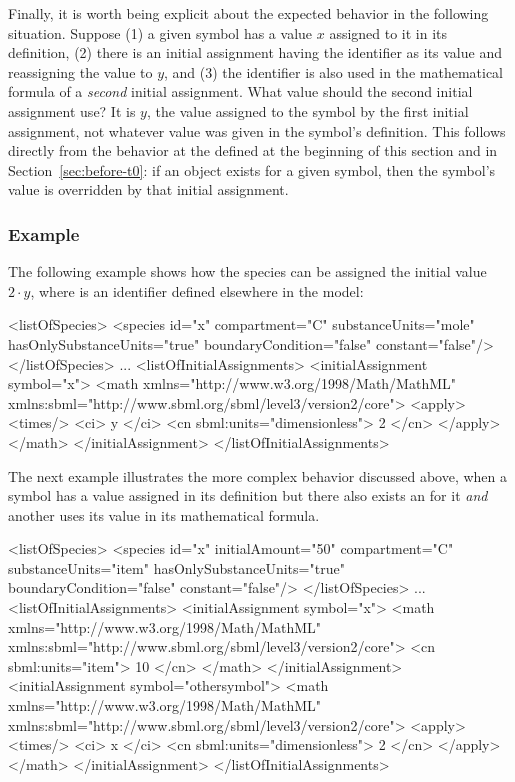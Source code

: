 Finally, it is worth being explicit about the expected behavior in
the following situation.  Suppose (1) a given symbol has a value
$x$ assigned to it in its definition, (2) there is an initial
assignment having the identifier as its  value and
reassigning the value to $y$, and (3) the identifier is
also used in the mathematical formula of a \emph{second} initial
assignment.  What value should the second initial assignment use?
It is $y$, the value assigned to the symbol by the first initial
assignment, not whatever value was given in the symbol's
definition.  This follows directly from the behavior at the
defined at the beginning of this section and in
Section~\ref{sec:before-t0}: if an \InitialAssignment object
exists for a given symbol, then the symbol's value is overridden
by that initial assignment.


\subsubsection{Example}

The following example shows how the species  can be
assigned the initial value $2 \cdot y$, where  is an
identifier defined elsewhere in the model:

\begin{example}
<listOfSpecies>
    <species id="x" compartment="C" substanceUnits="mole"
             hasOnlySubstanceUnits="true" boundaryCondition="false" constant="false"/>
</listOfSpecies>
...
<listOfInitialAssignments>
    <initialAssignment symbol="x">
        <math xmlns="http://www.w3.org/1998/Math/MathML"
              xmlns:sbml="http://www.sbml.org/sbml/level3/version2/core">
            <apply>
                <times/> 
                <ci> y </ci> 
                <cn sbml:units="dimensionless"> 2 </cn>
            </apply>
        </math>
    </initialAssignment>
</listOfInitialAssignments>
\end{example}

The next example illustrates the more complex behavior discussed
above, when a symbol has a value assigned in its definition but
there also exists an \InitialAssignment for it \emph{and} another
\InitialAssignment uses its value in its mathematical formula.

\begin{example}
<listOfSpecies>
    <species id="x" initialAmount="50" compartment="C" substanceUnits="item"
             hasOnlySubstanceUnits="true" boundaryCondition="false" constant="false"/>
</listOfSpecies>
...
<listOfInitialAssignments>
    <initialAssignment symbol="x">
        <math xmlns="http://www.w3.org/1998/Math/MathML"
              xmlns:sbml="http://www.sbml.org/sbml/level3/version2/core">
            <cn sbml:units="item"> 10 </cn>
        </math>
    </initialAssignment>
    <initialAssignment symbol="othersymbol">
        <math xmlns="http://www.w3.org/1998/Math/MathML"
              xmlns:sbml="http://www.sbml.org/sbml/level3/version2/core">
            <apply>
                <times/>
                <ci> x </ci>
                <cn sbml:units="dimensionless"> 2 </cn>
            </apply>
        </math>
    </initialAssignment>
</listOfInitialAssignments>
\end{example}

